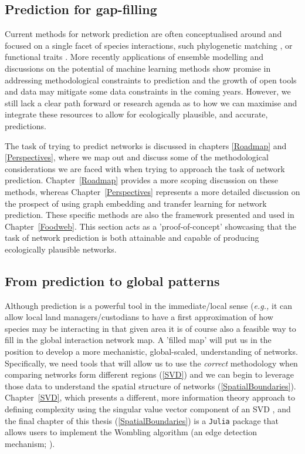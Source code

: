 \subsection{Prediction for gap-filling}

Current methods for network prediction are often conceptualised around and focused on a single facet of species interactions, such phylogenetic matching \cite{Pomeranz2018InfPre, Elmasri2020HieBay}, or functional traits \cite{Bartomeus2016ComFra}. More recently applications of ensemble modelling \cite{Becker2020PreWil} and discussions on the potential of machine learning methods \cite{Desjardins-Proulx2019ArtInt} show promise in addressing methodological constraints to prediction and the growth of open tools and data may mitigate some data constraints in the coming years. However, we still lack a clear path forward or research agenda as to how we can maximise and integrate these resources to allow for ecologically plausible, and accurate, predictions.

The task of trying to predict networks is discussed in chapters \ref{Roadmap} and \ref{Perspectives}, where we map out and discuss some of the methodological considerations we are faced with when trying to approach the task of network prediction. Chapter~\ref{Roadmap} provides a more scoping discussion on these methods, whereas Chapter~\ref{Perspectives} represents a more detailed discussion on the prospect of using graph embedding and transfer learning for network prediction. These specific methods are also the framework presented and used in Chapter~\ref{Foodweb}. This section acts as a 'proof-of-concept' showcasing that the task of network prediction is both attainable and capable of producing ecologically plausible networks.

\subsection{From prediction to global patterns}

Although prediction is a powerful tool in the immediate/local sense 
(\emph{e.g.,} it can allow local land managers/custodians to have a 
first approximation of how species may be interacting in that given area it is of course also a feasible way to fill in the global interaction network map. A 'filled map' will put us in the position to develop a more mechanistic, global-scaled, understanding of networks. Specifically, we need tools that will allow us to use the \emph{correct} methodology when comparing networks form different regions (\autoref{SVD}) and we can begin to leverage those data to understand the spatial structure of networks (\autoref{SpatialBoundaries}). Chapter~\ref{SVD}, which presents a different, more information theory approach to defining complexity using the singular value vector component of an SVD \cite{Shannon1948MatThe}, and the final chapter of this thesis (\autoref{SpatialBoundaries}) is a \texttt{Julia} package that allows users to implement the Wombling algorithm (an edge detection mechanism; \cite{Womble1951DifSys}).

